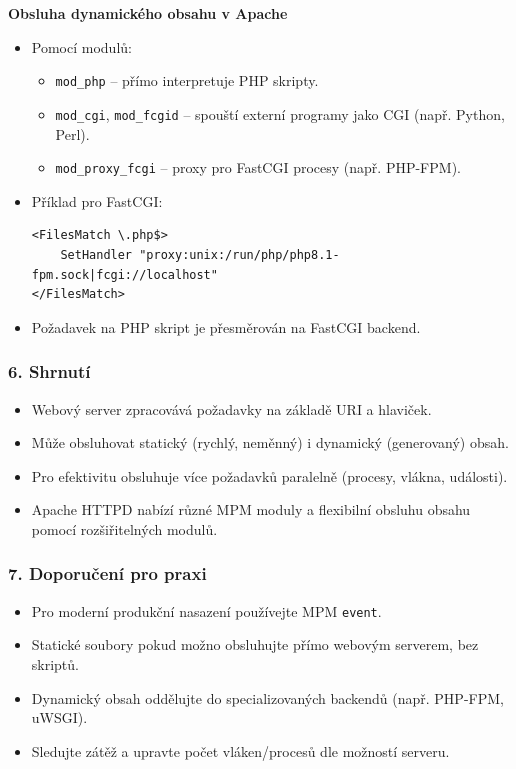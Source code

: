 \textbf{Obsluha dynamického obsahu v Apache}

\begin{itemize}
    \item Pomocí modulů:
        \begin{itemize}
            \item \texttt{mod\_php} – přímo interpretuje PHP skripty.
            \item \texttt{mod\_cgi}, \texttt{mod\_fcgid} – spouští externí programy jako CGI (např. Python, Perl).
            \item \texttt{mod\_proxy\_fcgi} – proxy pro FastCGI procesy (např. PHP-FPM).
        \end{itemize}
    \item Příklad pro FastCGI:

\begin{verbatim}
<FilesMatch \.php$>
    SetHandler "proxy:unix:/run/php/php8.1-fpm.sock|fcgi://localhost"
</FilesMatch>
\end{verbatim}

    \item Požadavek na PHP skript je přesměrován na FastCGI backend.
\end{itemize}

\subsubsection*{6. Shrnutí}

\begin{itemize}
    \item Webový server zpracovává požadavky na základě URI a hlaviček.
    \item Může obsluhovat statický (rychlý, neměnný) i dynamický (generovaný) obsah.
    \item Pro efektivitu obsluhuje více požadavků paralelně (procesy, vlákna, události).
    \item Apache HTTPD nabízí různé MPM moduly a flexibilní obsluhu obsahu pomocí rozšiřitelných modulů.
\end{itemize}

\subsubsection*{7. Doporučení pro praxi}

\begin{itemize}
    \item Pro moderní produkční nasazení používejte MPM \texttt{event}.
    \item Statické soubory pokud možno obsluhujte přímo webovým serverem, bez skriptů.
    \item Dynamický obsah oddělujte do specializovaných backendů (např. PHP-FPM, uWSGI).
    \item Sledujte zátěž a upravte počet vláken/procesů dle možností serveru.
\end{itemize}
